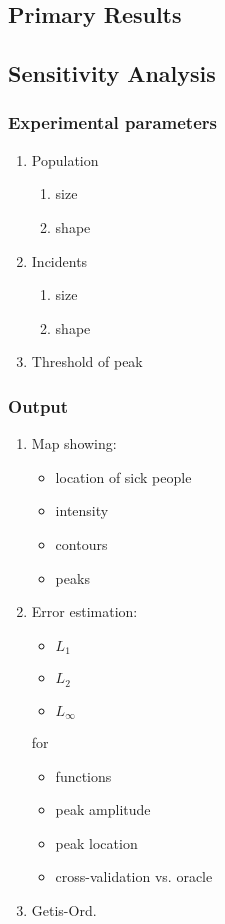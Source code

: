 
\begin{singlespace*}

\section{Primary Results}

\subsection{Sensitivity Analysis}

\subsubsection{Experimental parameters}

\begin{enumerate}
\item Population
	\begin{enumerate}
	\item size
	\item shape
	\end{enumerate}
\item Incidents
	\begin{enumerate}
	\item size
	\item shape
	\end{enumerate}
\item Threshold of peak
\end{enumerate}

\subsubsection{Output}

\begin{enumerate}
\item Map showing:
	\begin{itemize}
	\item location of sick people
	\item intensity
	\item contours
	\item peaks
	\end{itemize}
\item Error estimation:
	\begin{itemize}
	\item $L_1$
	\item $L_2$
	\item $L_\infty$
	\end{itemize}
	for
	\begin{itemize}
	\item functions
	\item peak amplitude
	\item peak location
	\item cross-validation vs. oracle
	\end{itemize}
\item Getis-Ord.


\end{enumerate}
\end{singlespace*}
